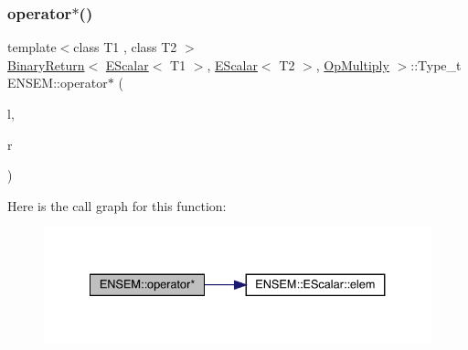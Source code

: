 \subsubsection{\texorpdfstring{operator$\ast$()}{operator*()}\hspace{0.1cm}{\footnotesize\ttfamily [1/9]}}
{\footnotesize\ttfamily template$<$class T1 , class T2 $>$ \\
\mbox{\hyperlink{structENSEM_1_1BinaryReturn}{Binary\+Return}}$<$ \mbox{\hyperlink{classENSEM_1_1EScalar}{E\+Scalar}}$<$ T1 $>$, \mbox{\hyperlink{classENSEM_1_1EScalar}{E\+Scalar}}$<$ T2 $>$, \mbox{\hyperlink{structENSEM_1_1OpMultiply}{Op\+Multiply}} $>$\+::Type\+\_\+t E\+N\+S\+E\+M\+::operator$\ast$ (\begin{DoxyParamCaption}\item[{const \mbox{\hyperlink{classENSEM_1_1EScalar}{E\+Scalar}}$<$ T1 $>$ \&}]{l,  }\item[{const \mbox{\hyperlink{classENSEM_1_1EScalar}{E\+Scalar}}$<$ T2 $>$ \&}]{r }\end{DoxyParamCaption})\hspace{0.3cm}{\ttfamily [inline]}}

Here is the call graph for this function\+:
\nopagebreak
\begin{figure}[H]
\begin{center}
\leavevmode
\includegraphics[width=334pt]{d4/dca/group__escalar_ga87a689c2f74aa616bca6523845562c12_cgraph}
\end{center}
\end{figure}
\mbox{\label{group__escalar_gae8dabaf2e8ff409632f9943294b5a6b4}} 
